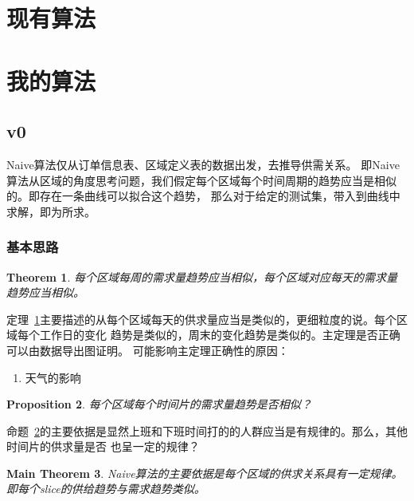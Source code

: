 \documentclass[hyperref,UTF8]{ctexart}
\newtheorem{thm}{Theorem}[subsection]
\newtheorem{prop}[thm]{Proposition}
\newtheorem{mthm}[thm]{Main Theorem}
\theoremstyle{definition}
\theoremstyle{remark}
\numberwithin{equation}{subsection}
\begin{document}
\section{现有算法}
\label{sec:current_algo}



\section{我的算法}
\label{sec:basic_thought}

\subsection{v0}
\label{subsec:algo_v0}

	Naive算法仅从订单信息表、区域定义表的数据出发，去推导供需关系。
	即Naive算法从区域的角度思考问题，我们假定每个区域每个时间周期的趋势应当是相似的。即存在一条曲线可以拟合这个趋势，
	那么对于给定的测试集，带入到曲线中求解，即为所求。
	
\subsubsection{基本思路}

	\begin{thm}
	\label{thm:v0_district_trend}
	每个区域每周的需求量趋势应当相似，每个区域对应每天的需求量趋势应当相似。
	\end{thm}
	
	定理~\ref{thm:v0_district_trend}主要描述的从每个区域每天的供求量应当是类似的，更细粒度的说。每个区域每个工作日的变化
	趋势是类似的，周末的变化趋势是类似的。主定理是否正确可以由数据导出图证明。
	可能影响主定理正确性的原因：
	\begin{enumerate}[(1)]
	
		\item 天气的影响
		
	\end{enumerate}

	\begin{prop}
	\label{prop:v0_time_slice_trend}
	每个区域每个时间片的需求量趋势是否相似？
	\end{prop}
	
	命题~\ref{prop:v0_time_slice_trend}的主要依据是显然上班和下班时间打的的人群应当是有规律的。那么，其他时间片的供求量是否
	也呈一定的规律？
	
	\begin{mthm}
	\label{mthm:v0_basis}
	Naive算法的主要依据是每个区域的供求关系具有一定规律。即每个slice的供给趋势与需求趋势类似。
	\end{mthm}
	
\end{document}
